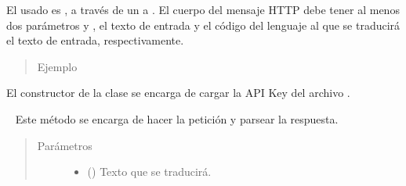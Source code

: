 \begin{fulllineitems}
\begin{fulllineitems}
El usado es , a través de un  a
. El cuerpo
del mensaje HTTP debe tener al menos dos parámetros  y ,
el texto de entrada y el código del lenguaje al que se traducirá el texto
de entrada, respectivamente.
\begin{quote}\begin{description}
\item[{Ejemplo}] \leavevmode
\end{description}\end{quote}

\begin{sphinxVerbatim}[commandchars=\\\{\}]
   
  
 
\end{sphinxVerbatim}

El constructor de la clase se encarga de cargar la API Key del archivo
.

\begin{fulllineitems}
\label{\detokenize{chapter_two/desc_cloudnao:app.tpa_client_libraries.google_cloud_translation.GoogleCloudTranslation.translate}}~
Este método se encarga de hacer la petición y parsear la respuesta.
\begin{quote}\begin{description}
\item[{Parámetros}] \leavevmode\begin{itemize}
\item {} 
 () \textendash{} Texto que se traducirá.


\end{itemize}
\end{description}
\end{quote}
\end{fulllineitems}
\end{fulllineitems}
\end{fulllineitems}

